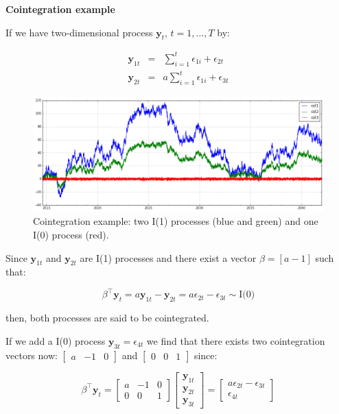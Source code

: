 \vspace{15mm}

\textbf{Cointegration example} \quad

If we have two-dimensional process $\mathbf{y}_t$, $t=1,\dots,T$ by:

\begin{eqnarray*}
\mathbf{y}_{1t} &=& \sum_{i=1}^t \epsilon_{1i} + \epsilon_{2t} \\
\mathbf{y}_{2t} &=& a \sum_{i=1}^t \epsilon_{1i} + \epsilon_{3t} 
\end{eqnarray*}


\begin{figure}[!h]
  \centering
  \includegraphics[width=\textwidth]{img/coint-example}
  \caption[Cointegration example]{Cointegration example: two I(1) processes (blue and green) and one I(0) process (red).}
  \label{fig:cointex}
\end{figure}

Since $\mathbf{y}_{1t}$ and $\mathbf{y}_{2t}$ are I(1) processes and there
exist a vector $\beta = [a -1]$ such that:

\[
\beta^\top \mathbf{y}_t = a \mathbf{y}_{1t} -\mathbf{y}_{2t} = 
a\epsilon_{2t} - \epsilon_{3t} \sim \text{I(0)}
\]

then, both processes are said to be cointegrated. 


If we add a I(0) process
$\mathbf{y}_{3t} = \epsilon_{4t}$  we find that there exists two cointegration
vectors now: $\begin{bmatrix}a &-1& 0\end{bmatrix}$ and $\begin{bmatrix}0
&0&1\end{bmatrix}$ since:

\[
\beta^\top \mathbf{y}_t = 
\begin{bmatrix}
a & -1 & 0 \\
0 & 0 & 1
\end{bmatrix} 
\begin{bmatrix} 
\mathbf{y}_{1t} \\
\mathbf{y}_{2t} \\
\mathbf{y}_{3t}
\end{bmatrix} = 
\begin{bmatrix}
a\epsilon_{2t} - \epsilon_{3t} \\
\epsilon_{4t}
\end{bmatrix}
\]

